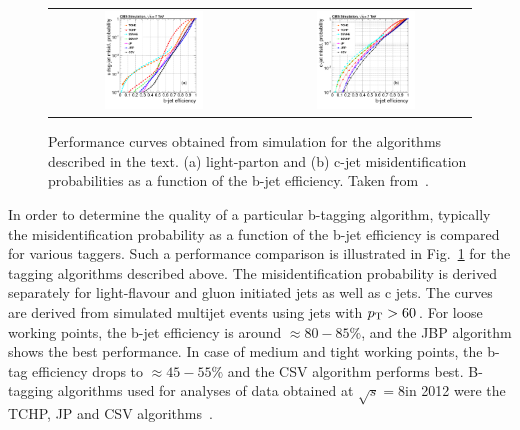 \begin{figure}[!tp]
  \centering 
  \begin{tabular}{cc}
    \includegraphics[width=0.49\textwidth]{figures/figAlgo_Combined_udsgvsb_Efficienies.png} &
    \includegraphics[width=0.49\textwidth]{figures/figAlgo_Combined_cvsb_Efficienies.png} 
  \end{tabular}
  \caption{Performance curves obtained from simulation for the algorithms described in the text. (a) light-parton and (b) c-jet misidentification probabilities as a function of the b-jet efficiency. Taken from~\cite{Chatrchyan:2012jua}.}
  \label{fig:btagging}
\end{figure}  
In order to determine the quality of a particular b-tagging algorithm, typically the misidentification probability as a function of the b-jet efficiency is compared for various taggers. Such a performance comparison is illustrated in Fig.~\ref{fig:btagging} for the tagging algorithms described above. The misidentification probability is derived separately for light-flavour and gluon initiated jets as well as c jets. The curves are derived from simulated multijet events using jets with $p_{\text{T}} > 60$\,\gev. For loose working points, the b-jet efficiency is around $\approx 80-85\%$, and the JBP algorithm shows the best performance. In case of medium and tight working points, the b-tag efficiency drops to $\approx 45-55\%$ and the CSV algorithm performs best. B-tagging algorithms used for analyses of data obtained at $\sqrt{s} = 8$\tev in 2012 were the TCHP, JP and CSV algorithms~\cite{CMS-PAS-BTV-13-001}. 
